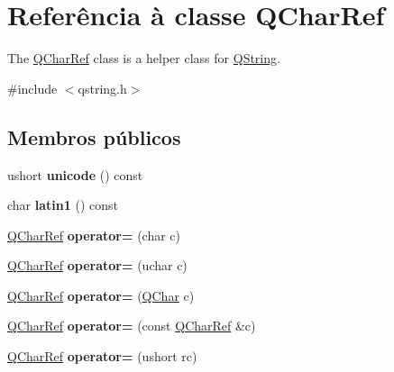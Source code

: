 \hypertarget{class_q_char_ref}{\section{Referência à classe Q\-Char\-Ref}
\label{class_q_char_ref}
}


The \hyperlink{class_q_char_ref}{Q\-Char\-Ref} class is a helper class for \hyperlink{class_q_string}{Q\-String}.  




{\ttfamily \#include $<$qstring.\-h$>$}

\subsection*{Membros públicos}
\begin{DoxyCompactItemize}
\item 
\hypertarget{class_q_char_ref_adbb6411982cdf1d5213ca84058629fe3}{ushort {\bfseries unicode} () const }\label{class_q_char_ref_adbb6411982cdf1d5213ca84058629fe3}

\item 
\hypertarget{class_q_char_ref_aef586395e322881ad34f67ee323b524d}{char {\bfseries latin1} () const }\label{class_q_char_ref_aef586395e322881ad34f67ee323b524d}

\item 
\hypertarget{class_q_char_ref_ac7f5fe4d3adad0a1bff33bbaf7922eab}{\hyperlink{class_q_char_ref}{Q\-Char\-Ref} {\bfseries operator=} (char c)}\label{class_q_char_ref_ac7f5fe4d3adad0a1bff33bbaf7922eab}

\item 
\hypertarget{class_q_char_ref_ab39a571f43f21bf65d3c3591abe4c4f5}{\hyperlink{class_q_char_ref}{Q\-Char\-Ref} {\bfseries operator=} (uchar c)}\label{class_q_char_ref_ab39a571f43f21bf65d3c3591abe4c4f5}

\item 
\hypertarget{class_q_char_ref_aca0ab57f352726c6f9b7004ef396954d}{\hyperlink{class_q_char_ref}{Q\-Char\-Ref} {\bfseries operator=} (\hyperlink{class_q_char}{Q\-Char} c)}\label{class_q_char_ref_aca0ab57f352726c6f9b7004ef396954d}

\item 
\hypertarget{class_q_char_ref_aafdaeb4d86bf9c9578e36a6ab28e8768}{\hyperlink{class_q_char_ref}{Q\-Char\-Ref} {\bfseries operator=} (const \hyperlink{class_q_char_ref}{Q\-Char\-Ref} \&c)}\label{class_q_char_ref_aafdaeb4d86bf9c9578e36a6ab28e8768}

\item 
\hypertarget{class_q_char_ref_a2e285bb554cd34bb0658c99e8a0ae27a}{\hyperlink{class_q_char_ref}{Q\-Char\-Ref} {\bfseries operator=} (ushort rc)}\label{class_q_char_ref_a2e285bb554cd34bb0658c99e8a0ae27a}


\end{DoxyCompactItemize}
